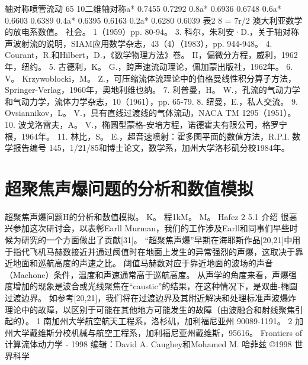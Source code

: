 \documentclass[UTF8,11pt,a4paper,openany,fontset=fandol]{ctexbook}
\begin{document}
轴对称喷管流动 65 10二维轴对称a* 0.7455 0.7292 0.8a* 0.6936 0.6748 0.6a* 0.6603 0.6389 0.4a* 0.6395 0.6163 0.2a* 0.6280 0.6039 表2 8 = 7r/2 澳大利亚数学的放电系数值。 社会。 1（1959）pp. 80-94。 3. 科尔，朱利安·D.，关于轴对称声波射流的说明，SIAM应用数学杂志，43（4）（1983），pp. 944-948。 4. Courant，R.和Hilbert，D.，《数学物理方法》卷。 II，偏微分方程，威利，1962年，纽约。 5. 古德利，K。 G.，跨声速流动理论，佩加蒙出版社，1962年。 6. V。 Krzywoblocki，M。 Z.，可压缩流体流理论中的伯格曼线性积分算子方法，Springer-Verlag，1960年，奥地利维也纳。 7. 利普曼，H。 W.，孔流的气动力学和气动力学，流体力学杂志，10（1961），pp. 65-79. 8. 纽曼，E.，私人交流。 9. Ovsiannikov，L。 V.，具有直线过渡线的气体流动，NACA TM 1295（1951）。 10. 波戈洛雷夫，A。 V.，椭圆型蒙格-安培方程，诺德霍夫有限公司，格罗宁根，1964年。 11. 林比，S。 E.，超音速喷射：霍多图平面的数值方法，R.P.I. 数学报告编号 145，1/21/85和博士论文，数学系，加州大学洛杉矶分校1984年。

\clearpage
\chapter{超聚焦声爆问题的分析和数值模拟}
超聚焦声爆问题H的分析和数值模拟。 K。 程1kM。 M。 Hafez 2 5.1 介绍 很高兴参加这次研讨会，以表彰Earll Murman，我们的工作涉及Earll和同事们早些时候为研究的一个方面做出了贡献[31]。 “超聚焦声爆”早期在海耶斯作品[20,21]中用于指代飞机马赫数接近并通过阈值时在地面上发生的异常强烈的声爆，这取决于靠近地面和巡航高度的声速之比。 阈值马赫数对应于靠近地面的波场的声音（Machone）条件，温度和声速通常高于巡航高度。 从声学的角度来看，声爆强度增加的现象是波合或光线聚焦在“caustic”的结果，在这种情况下，是双曲-椭圆过渡边界。 如参考[20,21]，我们将在过渡边界及其附近解决和处理标准声波爆炸理论中的故障，以区别于可能在其他地方可能发生的故障（由波融合和射线聚焦引起的）。 1 南加州大学航空航天工程系，洛杉矶，加利福尼亚州 90089-1191。 2 加州大学戴维斯分校机械与航空工程系，加利福尼亚州戴维斯，95616。 Frontiers of 计算流体动力学 - 1998 编辑：David A. Caughey和Mohamed M. 哈菲兹 ©1998 世界科学
\end{document}
